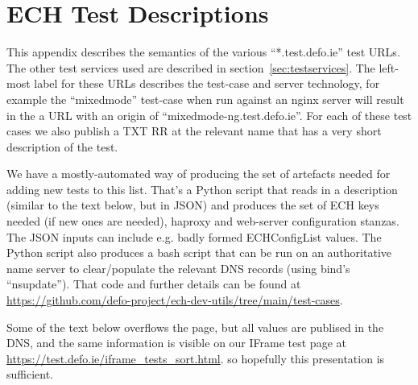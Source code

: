 \section{ECH Test Descriptions}
\label{app:testdescriptions}

This appendix describes the semantics of the various ``*.test.defo.ie'' test URLs.
The other test services used are described in section~\ref{sec:testservices}.
The left-most label for these URLs describes the test-case and server technology,
for example the ``mixedmode'' test-case when run against an nginx server will
result in the a URL with an origin of ``mixedmode-ng.test.defo.ie''. For each of
these test cases we also publish a TXT RR at the relevant name that has a very
short description of the test.

We have a mostly-automated way of producing the set of artefacts needed for
adding new tests to this list. That's a Python script that reads in a
description (similar to the text below, but in JSON) and produces the set of
ECH keys needed (if new ones are needed), haproxy and web-server configuration
stanzas. The JSON inputs can include e.g. badly formed ECHConfigList values.
The Python script also produces a bash script that can be run on an
authoritative name server to clear/populate the relevant DNS records (using
bind's ``nsupdate'').  That code and further  details can be found at
\url{https://github.com/defo-project/ech-dev-utils/tree/main/test-cases}.

Some of the text below overflows the page, but all values are publised in the
DNS, and the same information is visible on our IFrame test page at
\url{https://test.defo.ie/iframe_tests_sort.html}.  so hopefully this
presentation is sufficient.

